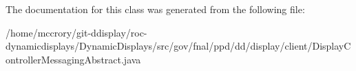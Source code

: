 The documentation for this class was generated from the following file\-:\begin{DoxyCompactItemize}
\item 
/home/mccrory/git-\/ddisplay/roc-\/dynamicdisplays/\-Dynamic\-Displays/src/gov/fnal/ppd/dd/display/client/Display\-Controller\-Messaging\-Abstract.\-java\end{DoxyCompactItemize}
